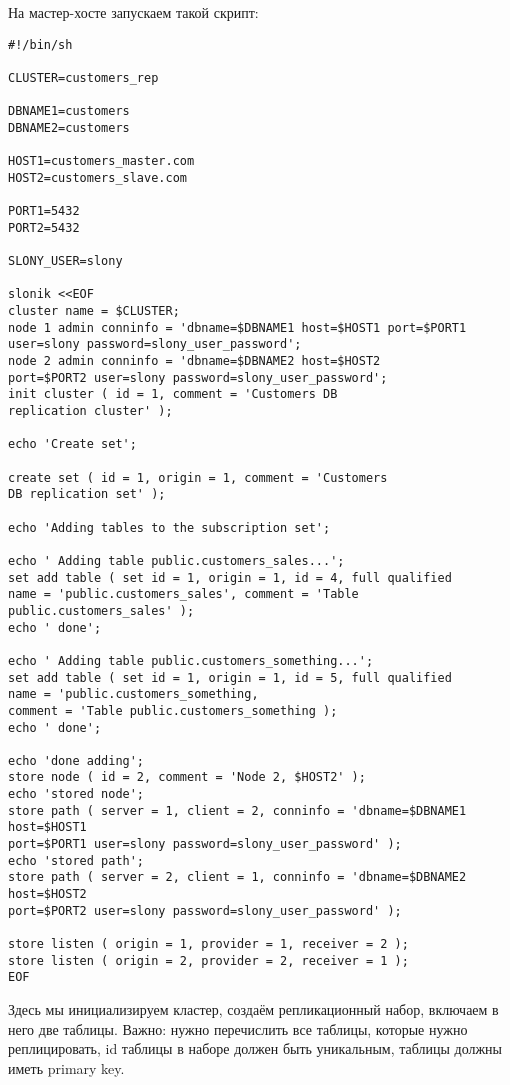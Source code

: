 На мастер-хосте запускаем такой скрипт:
\begin{lstlisting}[label=lst:slony9,caption=Инициализация кластера]
#!/bin/sh

CLUSTER=customers_rep

DBNAME1=customers
DBNAME2=customers

HOST1=customers_master.com
HOST2=customers_slave.com

PORT1=5432
PORT2=5432

SLONY_USER=slony

slonik <<EOF
cluster name = $CLUSTER;
node 1 admin conninfo = 'dbname=$DBNAME1 host=$HOST1 port=$PORT1 
user=slony password=slony_user_password';
node 2 admin conninfo = 'dbname=$DBNAME2 host=$HOST2 
port=$PORT2 user=slony password=slony_user_password';
init cluster ( id = 1, comment = 'Customers DB 
replication cluster' );

echo 'Create set';

create set ( id = 1, origin = 1, comment = 'Customers 
DB replication set' );

echo 'Adding tables to the subscription set';

echo ' Adding table public.customers_sales...';
set add table ( set id = 1, origin = 1, id = 4, full qualified 
name = 'public.customers_sales', comment = 'Table public.customers_sales' );
echo ' done';

echo ' Adding table public.customers_something...';
set add table ( set id = 1, origin = 1, id = 5, full qualified 
name = 'public.customers_something, 
comment = 'Table public.customers_something );
echo ' done';

echo 'done adding';
store node ( id = 2, comment = 'Node 2, $HOST2' );
echo 'stored node';
store path ( server = 1, client = 2, conninfo = 'dbname=$DBNAME1 host=$HOST1 
port=$PORT1 user=slony password=slony_user_password' );
echo 'stored path';
store path ( server = 2, client = 1, conninfo = 'dbname=$DBNAME2 host=$HOST2 
port=$PORT2 user=slony password=slony_user_password' );

store listen ( origin = 1, provider = 1, receiver = 2 );
store listen ( origin = 2, provider = 2, receiver = 1 );
EOF
\end{lstlisting}

Здесь мы инициализируем кластер, создаём репликационный набор, включаем в него две таблицы. 
Важно: нужно перечислить все таблицы, которые нужно реплицировать, id таблицы в наборе должен быть уникальным, 
таблицы должны иметь primary key.

